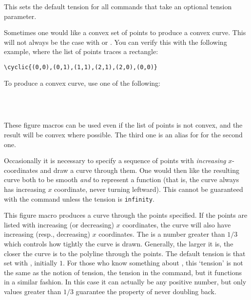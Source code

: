 \documentclass[letterpaper]{article}
\begin{document}
\begin{cd}
%
\end{cd}

This sets the default tension for all commands that take an optional
tension parameter.

Sometimes one would like a convex set of points to produce a convex
curve. This will not always be the case with  or .
You can verify this with the following example, where the list of points
traces a rectangle:
\begin{verbatim}
\cyclic{(0,0),(0,1),(1,1),(2,1),(2,0),(0,0)}
\end{verbatim}
To produce a convex curve, use one of the following:

\begin{cd}
\\
\\
%
%
%
%
\end{cd}

These figure macros can be used even if the list of points is not
convex, and the result will be convex where possible. The third one is
an alias for for the second one.

\medskip
Occasionally it is necessary to specify a sequence of points with
\emph{increasing} $x$-coordinates and draw a curve through them. One
would then like the resulting curve both to be smooth \textit{and} to
represent a function (that is, the curve always has increasing $x$
coordinate, never turning leftward). This cannot be guaranteed with the
 command unless the tension is \texttt{infinity}.

\begin{cd}
%
%
\end{cd}

This figure macro produces a curve through the points specified. If the
points are listed with increasing (or decreasing) $x$ coordinates, the
curve will also have increasing (resp., decreasing) $x$ coordinates. The
 is a number greater than $1/3$ which controls how tightly
the curve is drawn. Generally, the larger it is, the closer the curve is
to the polyline through the points. The default tension is that set with
, initially $1$. For those who know something about
\MF{}, this `tension' is not the same as the \MF{} notion of tension,
the tension in the  command, but it functions in a similar
fashion. In this case it can actually be any positive number, but only
values greater than $1/3$ guarantee the property of never doubling back.
\end{document}

